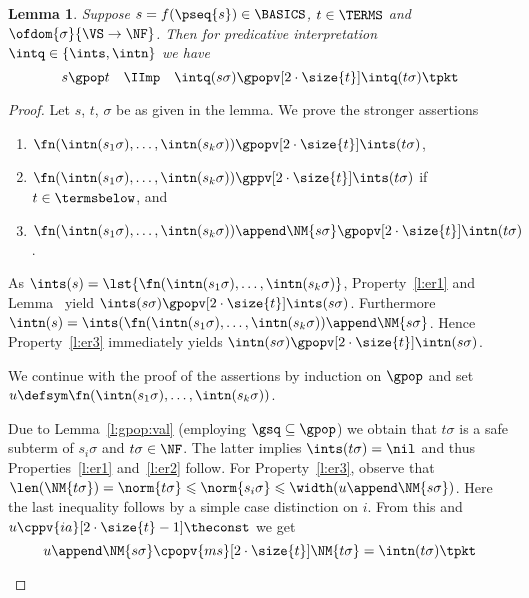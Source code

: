 \documentclass{LMCS}
\newtheorem{lemma}[thm]{Lemma}
\begin{document}
\begin{lemma}\label{l:embed:root}
  Suppose $s = f(\pseq{s}) \in \BASICS$, $t \in \TERMS$ and $\ofdom{\sigma}{\VS \to \NF}$. 
  Then for predicative interpretation $\intq \in \{\ints, \intn\}$
  we have 
  $$
   s \gpop t \quad \IImp \quad \intq(s\sigma) \gpopv[2\cdot\size{t}] \intq(t\sigma) \tpkt
  $$
\end{lemma}
\begin{proof}
  Let $s$, $t$, $\sigma$ be as given in the lemma.
  We prove the stronger assertions
  \begin{enumerate}[labelsep=*,leftmargin=*]
  \item \label{l:er1} $\fn(\intn(s_1\sigma), \dots, \intn(s_k\sigma)) \gpopv[2\cdot\size{t}] \ints(t\sigma)$, 
  \item \label{l:er2} $\fn(\intn(s_1\sigma), \dots, \intn(s_k\sigma)) \gppv[2\cdot\size{t}] \ints(t\sigma)$ if $t \in \termsbelow$, and
  \item \label{l:er3} $\fn(\intn(s_1\sigma), \dots, \intn(s_k\sigma)) \append \NM{s\sigma} \gpopv[2\cdot\size{t}] \intn(t\sigma)$.
  \end{enumerate}
As $\ints(s) = \lst{\fn(\intn(s_1\sigma), \dots, \intn(s_k\sigma)}$, 
Property~\ref{l:er1} and Lemma~
yield  $\ints(s\sigma) \gpopv[2\cdot\size{t}] \ints(s\sigma)$.
Furthermore
$\intn(s) = \ints(\fn(\intn(s_1\sigma), \dots, \intn(s_k\sigma)) \append \NM{s\sigma}$. 
Hence Property~\ref{l:er3} immediately
yields $\intn(s\sigma) \gpopv[2\cdot\size{t}] \intn(s\sigma)$.


We continue with the proof of the assertions by induction on $\gpop$ 
and set $u \defsym \fn(\intn(s_1\sigma), \dots, \intn(s_k\sigma))$.
\begin{description}[leftmargin=0.3cm]
  \item[{\dcase{$s \cpop{st} t$}}]
Due to Lemma~\ref{l:gpop:val} (employing ${\gsq} \subseteq {\gpop}$) 
we obtain that $t\sigma$ is a safe subterm of $s_i\sigma$
and $t\sigma \in \NF$.
The latter implies $\ints(t\sigma) = \nil$ and thus
Properties~\ref{l:er1} and~\ref{l:er2} follow.
For Property~\ref{l:er3}, observe that 
    $\len(\NM{t\sigma}) 
    = \norm{t\sigma} \leqslant \norm{s_i\sigma} 
    \leqslant \width(u \append \NM{s\sigma})$.
Here the last inequality follows by a simple case distinction on $i$.
From this and $u \cppv{ia}[2\cdot\size{t} - 1] \theconst$ we get
\begin{equation*}
      u \append \NM{s\sigma} \cpopv{ms}[2\cdot\size{t}] \NM{t\sigma} = \intn(t\sigma)
      \tpkt
    \end{equation*}


\end{description}
\end{proof}
\end{document}
